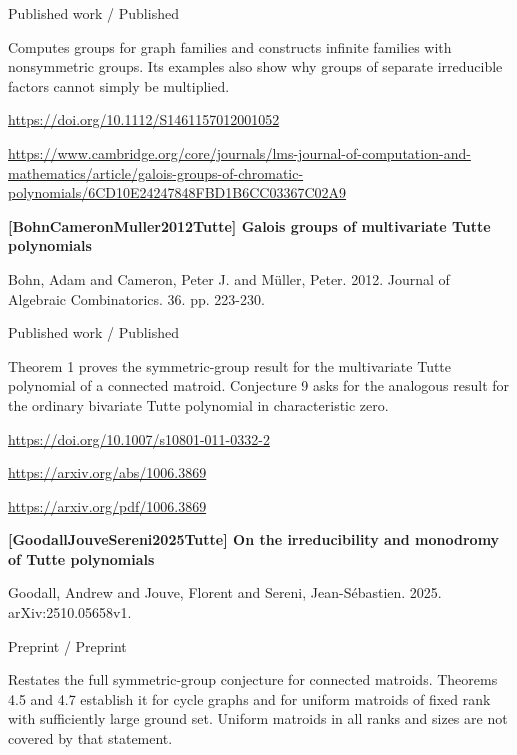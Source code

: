 \documentclass[11pt,a4paper,oneside,openany]{book}
\begin{document}
{\small\sffamily\color{atlasgold}Published work / Published}\par
\color{black} Computes groups for graph families and constructs infinite families with nonsymmetric groups. Its examples also show why groups of separate irreducible factors cannot simply be multiplied.\par
{\footnotesize\url{https://doi.org/10.1112/S1461157012001052}}\par
{\footnotesize\url{https://www.cambridge.org/core/journals/lms-journal-of-computation-and-mathematics/article/galois-groups-of-chromatic-polynomials/6CD10E24247848FBD1B6CC03367C02A9}}\par
\vspace{9pt}
\hypertarget{ref:BohnCameronMuller2012Tutte}{}
{\sffamily\bfseries\color{atlasgreen}[BohnCameronMuller2012Tutte] Galois groups of multivariate Tutte polynomials}\par
\color{black} Bohn, Adam and Cameron, Peter J. and Müller, Peter. 2012. Journal of Algebraic Combinatorics. 36. pp. 223-230.\par
{\small\sffamily\color{atlasgold}Published work / Published}\par
\color{black} Theorem 1 proves the symmetric-group result for the multivariate Tutte polynomial of a connected matroid. Conjecture 9 asks for the analogous result for the ordinary bivariate Tutte polynomial in characteristic zero.\par
{\footnotesize\url{https://doi.org/10.1007/s10801-011-0332-2}}\par
{\footnotesize\url{https://arxiv.org/abs/1006.3869}}\par
{\footnotesize\url{https://arxiv.org/pdf/1006.3869}}\par
\vspace{9pt}
\hypertarget{ref:GoodallJouveSereni2025Tutte}{}
{\sffamily\bfseries\color{atlasgreen}[GoodallJouveSereni2025Tutte] On the irreducibility and monodromy of Tutte polynomials}\par
\color{black} Goodall, Andrew and Jouve, Florent and Sereni, Jean-Sébastien. 2025. arXiv:2510.05658v1.\par
{\small\sffamily\color{atlasgold}Preprint / Preprint}\par
\color{black} Restates the full symmetric-group conjecture for connected matroids. Theorems 4.5 and 4.7 establish it for cycle graphs and for uniform matroids of fixed rank with sufficiently large ground set. Uniform matroids in all ranks and sizes are not covered by that statement.\par
\end{document}
